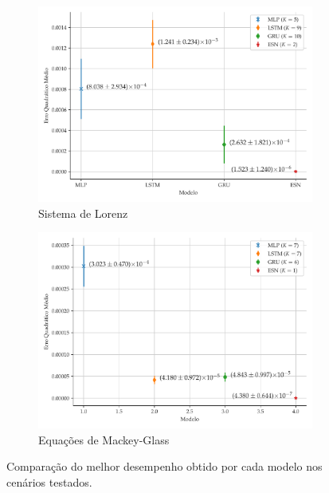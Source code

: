 \documentclass[a4paper, 12pt]{article}
\begin{document}
\begin{figure}[H]
     \centering
     \\
     \begin{subfigure}[t]{0.45\textwidth}
         \includegraphics[scale=0.385]{comparacao-k-lorenz.pdf}
         \caption{Sistema de Lorenz}
     \end{subfigure}
     \centering
     \begin{subfigure}[t]{0.45\textwidth} 
         \includegraphics[scale=0.385]{comparacao-k-mackeyglass.pdf}
         \caption{Equações de Mackey-Glass}
     \end{subfigure}  
     \centering   
     \caption{Comparação do melhor desempenho obtido por cada modelo nos cenários testados.}
     \label{fig:model-comparison}
\end{figure}
\end{document}
